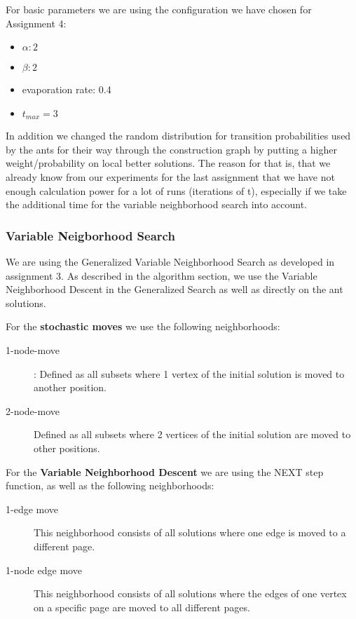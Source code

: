\documentclass{scrartcl}
\begin{document}
For basic parameters we are using the configuration we have chosen for Assignment 4:
\begin{itemize}
\item $\alpha: 2 $
\item $\beta: 2$
\item evaporation rate: 0.4
\item $t_{max}=3$
\end{itemize}
In addition we changed the random distribution for transition probabilities used by the ants for their 
way through the construction graph
by putting a higher weight/probability on local better solutions. 
The reason for that is, 
that we already know from our experiments for the last assignment that we have not enough calculation
power for a lot of runs (iterations of t), especially if we take the additional time for the
variable neighborhood search into account.

\subsubsection{Variable Neigborhood Search}

We are using the Generalized Variable Neighborhood Search as developed in assignment 3.
As described in the algorithm section, we use the Variable Neighborhood Descent in the Generalized
Search as well as directly on the ant solutions.

For the \textbf{stochastic moves} we use the following neighborhoods:

\begin{description}
\item[1-node-move]: Defined as all subsets where 1 vertex of the initial solution is moved to another position.
\item[2-node-move] 
Defined as all subsets where 2 vertices of the initial solution are moved to other positions.
\end{description}
 
For the \textbf{Variable Neighborhood Descent} we are using the NEXT step function, as well as the following 
neighborhoods:

\begin{description}
\item[1-edge move] This neighborhood consists of all solutions where one edge is moved to a different page. 
\item[1-node edge move] This neighborhood consists of all solutions where the edges of
	one vertex on a specific page are moved to all different pages. 
\end{description}
\end{document}
